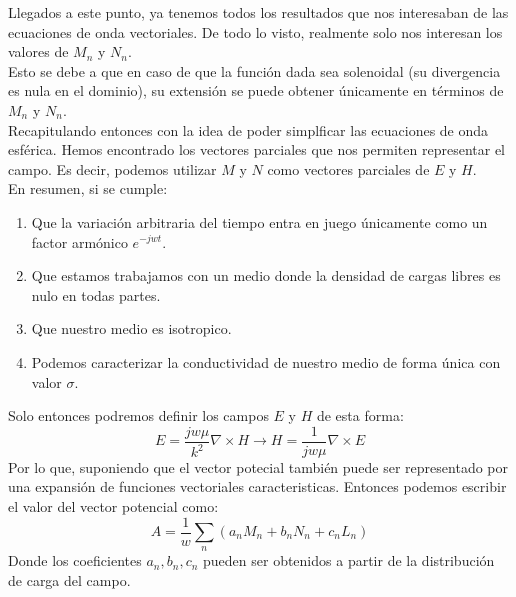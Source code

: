 \documentclass{article}
\begin{document}
Llegados a este punto, ya tenemos todos los resultados que nos interesaban de las ecuaciones de onda vectoriales. De todo lo visto, realmente solo nos interesan los valores de   $M_{n}$ y $N_{n}$.\\
Esto se debe a que en caso de que la función dada sea solenoidal (su divergencia es nula en el dominio), su extensión se puede obtener únicamente en términos de  $M_{n}$ y $N_{n}$. 
\\

Recapitulando entonces con la idea de poder simplficar las ecuaciones de onda esférica. Hemos encontrado los vectores parciales que nos permiten representar el campo. Es decir, podemos utilizar $M$ y $N$ como vectores parciales de $E$ y $H$.\\

En resumen, si se cumple:
\begin{enumerate}
    \item Que la variación arbitraria del tiempo entra en juego únicamente como un factor armónico $e^{-jwt}$.
    \item Que estamos trabajamos con un medio donde la densidad de cargas libres es nulo en todas partes.
    \item   Que nuestro medio es isotropico.
    \item Podemos caracterizar la conductividad de nuestro medio de forma única con valor $\sigma$.

\end{enumerate}
Solo entonces podremos definir los campos $E$ y $H$ de esta forma:
\begin{equation}
E = \frac{jw\mu}{k^2}\nabla \times H\xrightarrow{}   H= \frac{1}{jw\mu}\nabla \times E
\label{campo-EyH-cumpliendo-simplificacion-con-MnyNn}
\end{equation}
Por lo que, suponiendo que el vector potecial también puede ser representado por una expansión de funciones vectoriales caracteristicas. Entonces podemos escribir el valor del vector potencial como:
\begin{equation}
A = \frac{1}{w}\sum_{n}(a_{n}M_{n}+b_{n}N_{n}+c_{n}L_{n})
\label{vector-potencial-cumpliendo-simplificacion-con-MnyNn}
\end{equation}
Donde los coeficientes $a_{n}, b_{n}, c_{n}$ pueden ser obtenidos a partir de la distribución de carga del campo.
\end{document}
